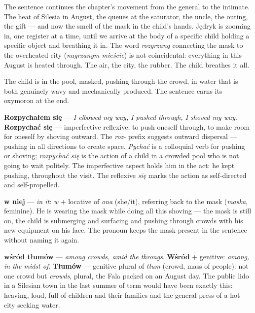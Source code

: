 \medskip
The sentence continues the chapter's movement
from the general to the intimate. The heat of
Silesia in August, the queues at the saturator,
the uncle, the outing, the gift --- and now the
smell of the mask in the child's hands. Jędryk
is zooming in, one register at a time, until we
arrive at the body of a specific child holding
a specific object and breathing it in. The word
\textit{rozgrzaną} connecting the mask to the
overheated city (\textit{nagrzanym mieście}) is
not coincidental: everything in this August is
heated through. The air, the city, the rubber.
The child breathes it all.



The child is in the pool, masked, pushing through
the crowd, in water that is both genuinely wavy and
mechanically produced. The sentence earns its oxymoron
at the end.

\textbf{Rozpychałem się} --- \textit{I elbowed my way,
I pushed through, I shoved my way}. \textbf{Rozpychać
się} --- imperfective reflexive: to push oneself
through, to make room for oneself by shoving outward.
The \textit{roz-} prefix suggests outward dispersal
--- pushing in all directions to create space.
\textit{Pychać} is a colloquial verb for pushing or
shoving; \textit{rozpychać się} is the action of a
child in a crowded pool who is not going to wait
politely. The imperfective aspect holds him in the
act: he kept pushing, throughout the visit. The
reflexive \textit{się} marks the action as
self-directed and self-propelled.

\textbf{w niej} --- \textit{in it}: \textit{w} +
locative of \textit{ona} (she/it), referring back
to the mask (\textit{maska}, feminine). He is
wearing the mask while doing all this shoving ---
the mask is still on, the child is submerging and
surfacing and pushing through crowds with his new
equipment on his face. The pronoun keeps the mask
present in the sentence without naming it again.

\textbf{wśród tłumów} --- \textit{among crowds,
amid the throngs}. \textbf{Wśród} + genitive:
\textit{among, in the midst of}. \textbf{Tłumów}
--- genitive plural of \textit{tłum} (crowd, mass
of people): not one crowd but \textit{crowds},
plural, the Fala packed on an August day. The
public lido in a Silesian town in the last summer
of term would have been exactly this: heaving,
loud, full of children and their families and the
general press of a hot city seeking water.

